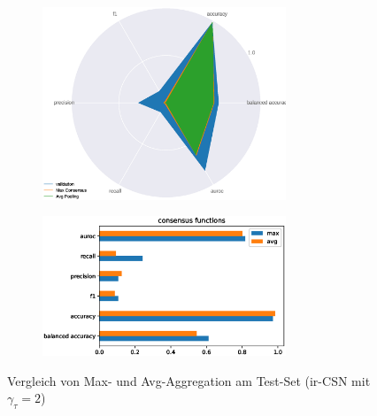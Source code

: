 \begin{figure}[htbp!]
    \centering
    \begin{subfigure}{.5\textwidth}
        \centering
        \includegraphics[width=0.8\textwidth, height=0.8\textwidth, keepaspectratio, interpolate]{img/07_consensus_radar.eps}
    \end{subfigure}%
    \begin{subfigure}{.5\textwidth}
        \centering
        \includegraphics[width=0.8\textwidth, height=0.8\textwidth, keepaspectratio, interpolate]{img/07_consensus.eps}
    \end{subfigure}
    \caption{Vergleich von Max- und Avg-Aggregation am Test-Set (ir-CSN mit $\gamma_\tau = 2$) }
    \label{fig:consensus}
\end{figure}


